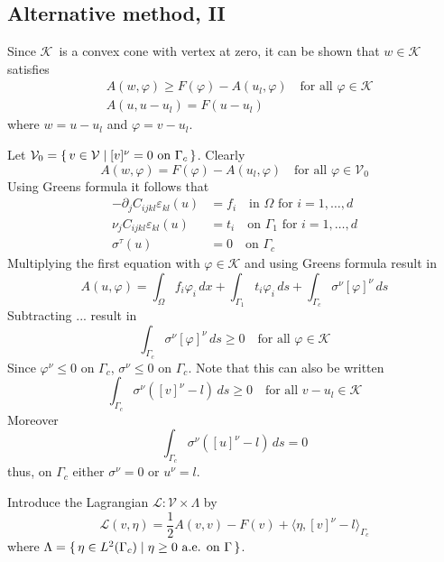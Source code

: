 \documentclass[12pt,a4paper]{article}
\numberwithin{equation}{section}
\numberwithin{table}{section}
\numberwithin{figure}{section}
\newcommand{\half}{\ensuremath{\frac{1}{2}}}
\newcommand{\pd}[1]{\ensuremath{\partial_{#1}}}
\renewcommand{\dj}{\pd{j}}
\newcommand{\V}{\ensuremath{\mathcal{V}}}
\newcommand{\K}{\ensuremath{\mathcal{K}}}
\newcommand{\Lagrange}{\ensuremath{\mathcal L}}
\newcommand{\intO}{\int_\Omega\!\!}
\newcommand{\intG}[1][0]{\int_{\Gamma_{#1}}\!\!}
\newcommand{\intGc}{\intG[c]}
\renewcommand{\epsilon}{\varepsilon}
\renewcommand{\phi}{\varphi}
\newcommand{\strain}[1][]{\ensuremath{\epsilon_{#1}}}
\newcommand{\epskl}{\strain[kl]}
\providecommand{\dualp}[2]{\langle #1, #2 \rangle}
\newcommand{\dx}{{\,dx}}
\newcommand{\ds}{{\,ds}}
\renewcommand{\forall}{\text{for all }}
\newcommand{\qforall}{\quad\text{for all }}
\begin{document}
\subsection{Alternative method, II}

Since \K\ is a convex cone with vertex at zero, it can be shown that $w\in \K$
satisfies
\begin{align}
  &A(w,\phi) \ge F(\phi) - A(u_l,\phi) \quad\forall{\phi\in \K} \\
  &A(u,u-u_l)  = F(u-u_l)
\end{align}
where $w=u-u_l$ and $\phi=v-u_l$.

Let $\V_0 = \set{v\in \V | [v]^\nu = 0 \text{ on }\Gamma_c}$. Clearly
\begin{equation}
  A(w,\phi) = F(\phi) - A(u_l, \phi) \quad\forall{\phi\in\V_0}
\end{equation}
Using Greens formula it follows that
\begin{align}
  \label{eq:elasteqFixedPoint}
  -\dj C_{ijkl}\epskl(u) &= f_i \quad\text{in $\Omega$ for $i=1,\ldots,d$} \\
  \nu_j C_{ijkl}\epskl(u) &= t_i \quad\text{on $\Gamma_1$ for $i=1,\ldots,d$} \\
  \sigma^\tau(u) &= 0 \quad\text{on $\Gamma_c$}
\end{align}
Multiplying the first equation with $\phi\in \K$ and using Greens formula result in
\begin{equation}
  A(u,\phi) = \intO f_i \phi_i\dx + \intG[1] t_i \phi_i \ds
  + \intGc \sigma^\nu [\phi]^\nu \ds
\end{equation}
Subtracting ... result in 
\begin{equation}
  \intGc \sigma^\nu [\phi]^\nu \ds \ge 0 \qforall \phi\in\K
\end{equation}
Since $\phi^\nu\le 0$ on $\Gamma_c$, $\sigma^\nu \le 0$ on $\Gamma_c$. Note that this can
also be written
\begin{equation}
  \intGc \sigma^\nu ([v]^\nu-l) \ds \ge 0 \qforall v-u_l\in\K
\end{equation}
Moreover
\begin{equation}
  \intGc \sigma^\nu ([u]^\nu - l) \ds = 0
\end{equation}
thus, on $\Gamma_c$ either $\sigma^\nu = 0$ or $u^\nu = l$.

Introduce the Lagrangian $\Lagrange:\V\times \Lambda$ by
\begin{equation}
  \Lagrange(v,\eta) = \half A(v,v) - F(v) + \dualp{\eta}{[v]^\nu-l}_{\Gamma_c}
\end{equation}
where $\Lambda=\set{\eta\in L^2(\Gamma_c) | \eta \ge 0 \text{ a.e. on }\Gamma}$.
\end{document}
